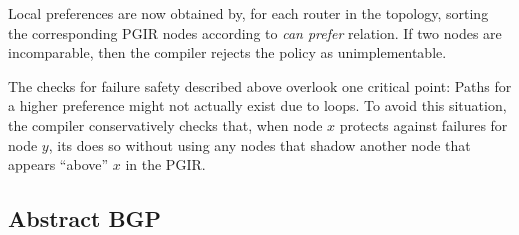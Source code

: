 Local preferences are now obtained by, for each router in the topology, sorting the corresponding PGIR nodes according to \textit{can prefer} relation. If two nodes are incomparable, then the compiler rejects the policy as unimplementable.


The checks for failure safety described above overlook one critical point: Paths for a higher preference might not actually exist due to loops. To avoid this situation, the compiler conservatively checks that, when node $x$ protects against failures for node $y$, its does so without using any nodes that shadow another node that appears ``above'' $x$ in the PGIR. 

\subsection{Abstract BGP}


\newcommand{\highlight}[1]{%
  \colorbox{red!50}{$\displaystyle#1$}}
\newcommand{\Router}[1]{\KW{Router} #1:}
\newcommand{\REGEX}[1]{\texttt{regex}(#1)}
\newcommand{\PEER}{\texttt{peer}}
\newcommand{\COMM}{\texttt{comm}}
\newcommand{\MED}{\texttt{MED}}
\newcommand{\Arrow}{\ensuremath{\leftarrow}}

